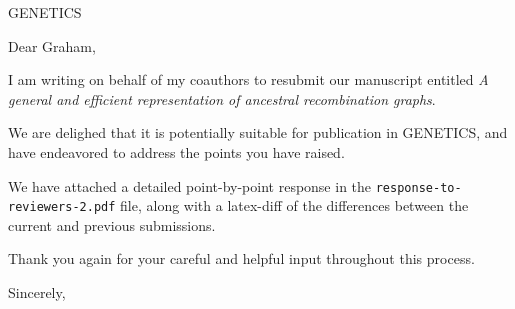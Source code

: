 \documentclass{letter}
\begin{document}
\begin{letter}{GENETICS}

\opening{Dear Graham,}

I am writing on behalf of my coauthors to resubmit our 
manuscript entitled
\emph{A general and efficient representation of ancestral recombination
graphs}. 

We are delighed that it is potentially suitable for publication in GENETICS,
and have endeavored to address the points you have raised.

We have attached a detailed point-by-point response in the 
\texttt{response-to-reviewers-2.pdf} file, along with a 
latex-diff of the differences between the current and previous submissions.

Thank you again for your careful and helpful input throughout this process.

\closing{Sincerely,}

\end{letter}
\end{document}
